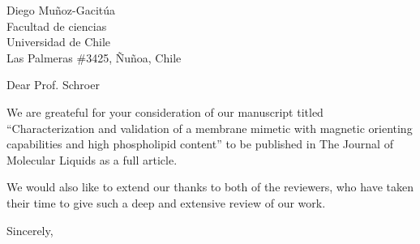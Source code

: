 \documentclass{letter}
\begin{document}
\begin{letter}{Diego Muñoz-Gacitúa\\ Facultad de ciencias \\ Universidad de
    Chile \\ Las Palmeras \#3425, Ñuñoa, Chile}

  \opening{Dear Prof. Schroer}

   We are greateful for your consideration of our manuscript titled
   ``Characterization and validation of a membrane mimetic with magnetic
   orienting capabilities and high phospholipid content'' to be published in The
   Journal of Molecular Liquids as a full article.

   We would also like to extend our thanks to both of the reviewers, who have
   taken their time to give such a deep and extensive review of our work.

   \closing{Sincerely,}

 \end{letter}
 
\end{document}

